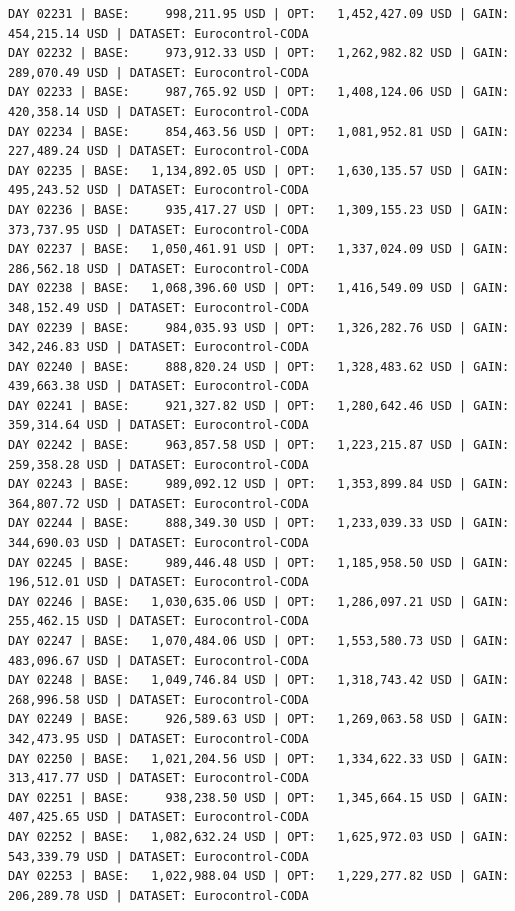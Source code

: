 \documentclass[11pt,a4paper]{article}
\begin{document}
\begin{verbatim}
DAY 02231 | BASE:     998,211.95 USD | OPT:   1,452,427.09 USD | GAIN: 454,215.14 USD | DATASET: Eurocontrol-CODA
DAY 02232 | BASE:     973,912.33 USD | OPT:   1,262,982.82 USD | GAIN: 289,070.49 USD | DATASET: Eurocontrol-CODA
DAY 02233 | BASE:     987,765.92 USD | OPT:   1,408,124.06 USD | GAIN: 420,358.14 USD | DATASET: Eurocontrol-CODA
DAY 02234 | BASE:     854,463.56 USD | OPT:   1,081,952.81 USD | GAIN: 227,489.24 USD | DATASET: Eurocontrol-CODA
DAY 02235 | BASE:   1,134,892.05 USD | OPT:   1,630,135.57 USD | GAIN: 495,243.52 USD | DATASET: Eurocontrol-CODA
DAY 02236 | BASE:     935,417.27 USD | OPT:   1,309,155.23 USD | GAIN: 373,737.95 USD | DATASET: Eurocontrol-CODA
DAY 02237 | BASE:   1,050,461.91 USD | OPT:   1,337,024.09 USD | GAIN: 286,562.18 USD | DATASET: Eurocontrol-CODA
DAY 02238 | BASE:   1,068,396.60 USD | OPT:   1,416,549.09 USD | GAIN: 348,152.49 USD | DATASET: Eurocontrol-CODA
DAY 02239 | BASE:     984,035.93 USD | OPT:   1,326,282.76 USD | GAIN: 342,246.83 USD | DATASET: Eurocontrol-CODA
DAY 02240 | BASE:     888,820.24 USD | OPT:   1,328,483.62 USD | GAIN: 439,663.38 USD | DATASET: Eurocontrol-CODA
DAY 02241 | BASE:     921,327.82 USD | OPT:   1,280,642.46 USD | GAIN: 359,314.64 USD | DATASET: Eurocontrol-CODA
DAY 02242 | BASE:     963,857.58 USD | OPT:   1,223,215.87 USD | GAIN: 259,358.28 USD | DATASET: Eurocontrol-CODA
DAY 02243 | BASE:     989,092.12 USD | OPT:   1,353,899.84 USD | GAIN: 364,807.72 USD | DATASET: Eurocontrol-CODA
DAY 02244 | BASE:     888,349.30 USD | OPT:   1,233,039.33 USD | GAIN: 344,690.03 USD | DATASET: Eurocontrol-CODA
DAY 02245 | BASE:     989,446.48 USD | OPT:   1,185,958.50 USD | GAIN: 196,512.01 USD | DATASET: Eurocontrol-CODA
DAY 02246 | BASE:   1,030,635.06 USD | OPT:   1,286,097.21 USD | GAIN: 255,462.15 USD | DATASET: Eurocontrol-CODA
DAY 02247 | BASE:   1,070,484.06 USD | OPT:   1,553,580.73 USD | GAIN: 483,096.67 USD | DATASET: Eurocontrol-CODA
DAY 02248 | BASE:   1,049,746.84 USD | OPT:   1,318,743.42 USD | GAIN: 268,996.58 USD | DATASET: Eurocontrol-CODA
DAY 02249 | BASE:     926,589.63 USD | OPT:   1,269,063.58 USD | GAIN: 342,473.95 USD | DATASET: Eurocontrol-CODA
DAY 02250 | BASE:   1,021,204.56 USD | OPT:   1,334,622.33 USD | GAIN: 313,417.77 USD | DATASET: Eurocontrol-CODA
DAY 02251 | BASE:     938,238.50 USD | OPT:   1,345,664.15 USD | GAIN: 407,425.65 USD | DATASET: Eurocontrol-CODA
DAY 02252 | BASE:   1,082,632.24 USD | OPT:   1,625,972.03 USD | GAIN: 543,339.79 USD | DATASET: Eurocontrol-CODA
DAY 02253 | BASE:   1,022,988.04 USD | OPT:   1,229,277.82 USD | GAIN: 206,289.78 USD | DATASET: Eurocontrol-CODA

\end{verbatim}
\end{document}
